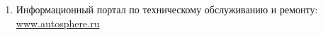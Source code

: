 \begin{enumerate}
\item Информационный портал по техническому обслуживанию и ремонту:\\ \url{www.autosphere.ru}
%

\end{enumerate}
